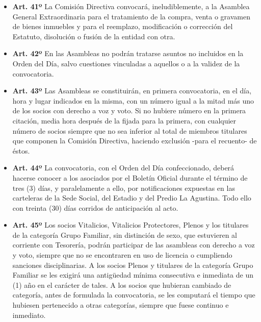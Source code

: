 \documentclass[]{book}
\providecommand{\tightlist}{%
  \setlength{\itemsep}{0pt}\setlength{\parskip}{0pt}}
\begin{document}
\begin{itemize}
\tightlist
\item
  \textbf{Art. 41º}
  La Comisión Directiva convocará, ineludiblemente, a la Asamblea General Extraordinaria para el tratamiento de la compra, venta o gravamen de bienes inmuebles y para el reemplazo, modificación o corrección del Estatuto, disolución o fusión de la entidad con otra.
\end{itemize}

\begin{itemize}
\tightlist
\item
  \textbf{Art. 42º}
  En las Asambleas no podrán tratarse asuntos no incluidos en la Orden del Día, salvo cuestiones vinculadas a aquellos o a la validez de la convocatoria.
\end{itemize}

\begin{itemize}
\tightlist
\item
  \textbf{Art. 43º}
  Las Asambleas se constituirán, en primera convocatoria, en el día, hora y lugar indicados en la misma, con un número igual a la mitad más uno de los socios con derecho a voz y voto. Si no hubiere número en la primera citación, media hora después de la fijada para la primera, con cualquier número de socios siempre que no sea inferior al total de miembros titulares que componen la Comisión Directiva, haciendo exclusión -para el recuento- de éstos.
\end{itemize}

\begin{itemize}
\tightlist
\item
  \textbf{Art. 44º}
  La convocatoria, con el Orden del Día confeccionado, deberá hacerse conocer a los asociados por el Boletín Oficial durante el término de tres (3) días, y paralelamente a ello, por notificaciones expuestas en las carteleras de la Sede Social, del Estadio y del Predio La Agustina. Todo ello con treinta (30) días corridos de anticipación al acto.
\end{itemize}

\begin{itemize}
\tightlist
\item
  \textbf{Art. 45º}
  Los socios Vitalicios, Vitalicios Protectores, Plenos y los titulares de la categoría Grupo Familiar, sin distinción de sexo, que estuvieren al corriente con Tesorería, podrán participar de las asambleas con derecho a voz y voto, siempre que no se encontraren en uso de licencia o cumpliendo sanciones disciplinarias. A los socios Plenos y titulares de la categoría Grupo Familiar se les exigirá una antigüedad mínima consecutiva e inmediata de un (1) año en el carácter de tales. A los socios que hubieran cambiado de categoría, antes de formulada la convocatoria, se les computará el tiempo que hubiesen pertenecido a otras categorías, siempre que fuese continuo e inmediato.
\end{itemize}
\end{document}
